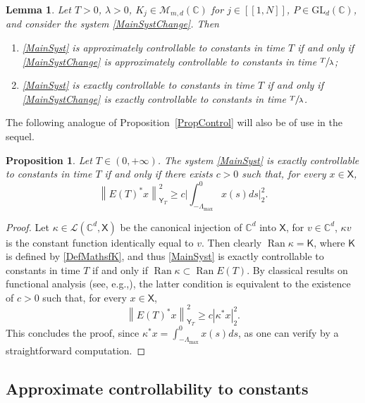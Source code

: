 \documentclass[JEP,XML,SOM,Unicode]{cedram}
\renewcommand{\eg}{e.g.,\xspace}
\newcommand{\llbracket}{[\![}
\newcommand{\rrbracket}{]\!]}
\theoremstyle{plain}
\newtheorem{lemm}[theo]{Lemma}
\newtheorem{prop}[theo]{Proposition}
\theoremstyle{definition}
\DeclareMathOperator{\range}{Ran}
\newcommand{\norm}[1]{\left\lVert #1\right\lVert}
\newcommand{\abs}[1]{\left\lvert #1\right \rvert}
\newcommand{\bgabs}[1]{\biggl\lvert #1\biggr \rvert}
\begin{document}
\begin{lemm}
\label{LemmInvariantConstants}
Let $T > 0$, $\lambda > 0$, $K_j \in \mathcal M_{m, d}(\mathbb C)$ for $j \in \llbracket 1, N\rrbracket$, $P \in \mathrm{GL}_d(\mathbb C)$, and consider the system \eqref{MainSystChange}. Then
\begin{enumerate}
\item\label{ApproxContrlConstIff} \eqref{MainSyst} is approximately controllable to constants in time $T$ if and only if \eqref{MainSystChange} is approximately controllable to constants in time $\sfrac{T}{\lambda}$;

\item\label{ExactContrlConstIff} \eqref{MainSyst} is exactly controllable to constants in time $T$ if and only if \eqref{MainSystChange} is exactly controllable to constants in time $\sfrac{T}{\lambda}$.
\end{enumerate}
\end{lemm}

The following analogue of Proposition~\ref{PropControl} will also be of use in the sequel.

\begin{prop}
\label{PropInegObservConst}
Let $T \in (0, +\infty)$. The system \eqref{MainSyst} is exactly controllable to constants in time $T$ if and only if there exists $c > 0$ such that, for every $x \in \mathsf X$,
\[
\norm{E(T)^\ast x}_{\mathsf Y_T}^2 \geq c \bgabs{\int_{-\Lambda_{\max}}^0 x(s) ds}_2^2.
\]
\end{prop}

\begin{proof}
Let $\kappa \in \mathcal L(\mathbb C^d, \mathsf X)$ be the canonical injection of $\mathbb C^d$ into $\mathsf X$, \ie for $v \in \mathbb C^d$, $\kappa v$ is the constant function identically equal to $v$. Then clearly $\range \kappa = \mathsf K$, where $\mathsf K$ is defined by \eqref{DefMathsfK}, and thus \eqref{MainSyst} is exactly controllable to constants in time $T$ if and only if $\range \kappa \subset \range E(T)$. By classical results on functional analysis (see, \eg \cite[Lem.\,2.48]{Coron2007Control}), the latter condition is equivalent to the existence of $c > 0$ such that, for every $x \in \mathsf X$,
\[
\norm{E(T)^\ast x}_{\mathsf Y_T}^2 \geq c \abs{\kappa^\ast x}_2^2.
\]
This concludes the proof, since $\kappa^\ast x = \int_{-\Lambda_{\max}}^0 x(s) ds$, as one can verify by a straightforward computation.
\end{proof}

\subsection{Approximate controllability to constants}
\label{SecApproxToConst}
\end{document}
